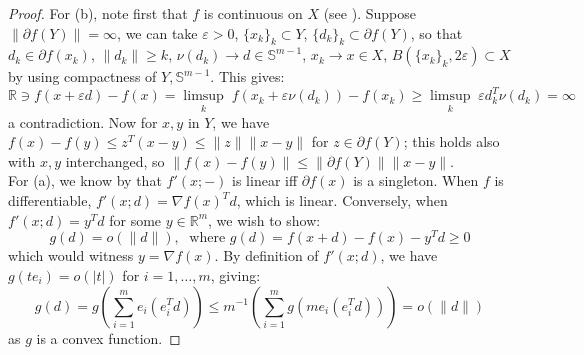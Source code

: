 \begin{proof}
	For (b), note first that $f$ is continuous on $X$ (see ). Suppose $\|\partial f(Y)\|=\infty$, we can take $\varepsilon >0$, $\{x_k\}_{k}\subset Y$, $\{d_k\}_{k}\subset \partial f(Y)$, so that $d_k\in \partial f(x_k)$, $\|d_k\|\geq k$, $\nu(d_k)\to d\in \mathbb{S}^{m-1}$, $x_k\to x\in X$, $B(\{x_k\}_{k},2 \varepsilon )\subset X$ by using compactness of $Y, \mathbb{S}^{m-1}$. This gives:
	\[
		\mathbb{R}\ni f(x+\varepsilon d) - f(x) = \underset{k}{\operatorname{limsup}}\;f(x_k + \varepsilon \nu(d_k))-f(x_k) \geq \underset{k}{\operatorname{limsup}}\;\varepsilon d_k^T \nu(d_k) = \infty
	\]
	a contradiction. Now for $x,y$ in $Y$, we have $f(x)-f(y)\leq z^T(x-y)\leq \|z\|\|x-y\|$ for $z\in \partial f(Y)$; this holds also with $x,y$ interchanged, so $\|f(x)-f(y)\|\leq \|\partial f(Y)\|\|x-y\|$.\\
	For (a), we know by  that $f'(x;-)$ is linear iff $\partial f(x)$ is a singleton. When $f$ is differentiable, $f'(x;d)=\nabla f(x)^Td$, which is linear. Conversely, when $f'(x; d)=y^Td$ for some $y\in \mathbb{R}^m$, we wish to show:
	\[
		g(d)=o(\|d\|),\;\text{ where }g(d)=f(x+d)-f(x)-y^Td\geq 0
	\]
	which would witness $y=\nabla f(x)$. By definition of $f'(x;d)$, we have $g(te_i)=o(|t|)$ for $i=1,\dotsc,m$, giving:
	\[
		g(d)= g \left( \sum_{i=1}^m e_i\left(e_i^Td\right) \right) \leq m^{-1} \left( \sum_{i=1}^m g\left(me_i(e_i^Td)\right) \right) = o(\|d\|)
	\]
	as $g$ is a convex function.
\end{proof}
